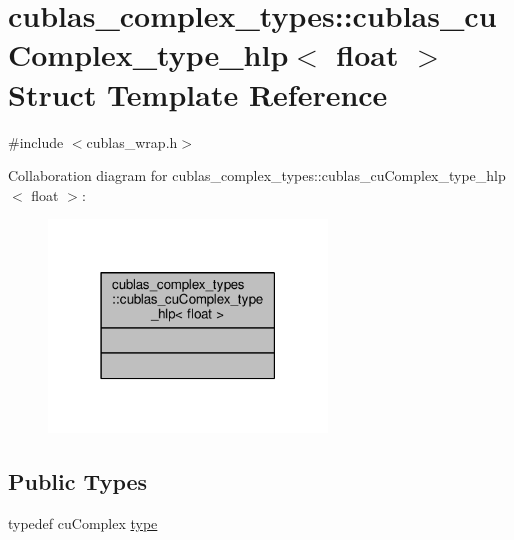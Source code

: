 \hypertarget{structcublas__complex__types_1_1cublas__cuComplex__type__hlp_3_01float_01_4}{\section{cublas\-\_\-complex\-\_\-types\-:\-:cublas\-\_\-cu\-Complex\-\_\-type\-\_\-hlp$<$ float $>$ Struct Template Reference}
\label{structcublas__complex__types_1_1cublas__cuComplex__type__hlp_3_01float_01_4}
}


{\ttfamily \#include $<$cublas\-\_\-wrap.\-h$>$}



Collaboration diagram for cublas\-\_\-complex\-\_\-types\-:\-:cublas\-\_\-cu\-Complex\-\_\-type\-\_\-hlp$<$ float $>$\-:
\nopagebreak
\begin{figure}[H]
\begin{center}
\leavevmode
\includegraphics[width=210pt]{structcublas__complex__types_1_1cublas__cuComplex__type__hlp_3_01float_01_4__coll__graph}
\end{center}
\end{figure}
\subsection*{Public Types}
\begin{DoxyCompactItemize}
\item 
typedef cu\-Complex \hyperlink{structcublas__complex__types_1_1cublas__cuComplex__type__hlp_3_01float_01_4_add4b8ecc2b817f1dc6df9ba43ec67c03}{type}
\end{DoxyCompactItemize}


